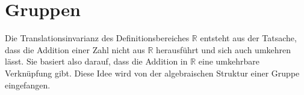 %
%
%
\section{Gruppen
\label{buch:gruppen:section:gruppe}}
Die Translationsinvarianz des Definitionsbereiches $\mathbb{R}$
entsteht aus der Tatsache, dass die Addition einer Zahl
nicht aus $\mathbb{R}$ herausführt und sich auch umkehren lässt.
Sie basiert also darauf, dass die Addition in $\mathbb{R}$ eine
umkehrbare Verknüpfung gibt.
Diese Idee wird von der algebraischen Struktur einer Gruppe eingefangen.







